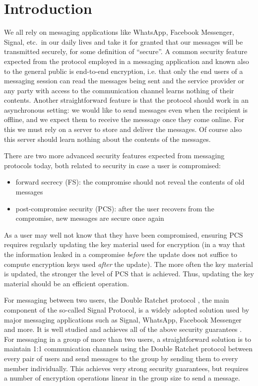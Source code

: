 \chapter{Introduction}

We all rely on messaging applications like WhatsApp, Facebook Messenger, Signal, etc.\ in our daily lives and take it for granted that our messages will be transmitted securely, for some definition of ``secure''. A common security feature expected from the protocol employed in a messaging application and known also to the general public is end-to-end encryption, i.e. that only the end users of a messaging session can read the messages being sent and the service provider or any party with access to the communication channel learns nothing of their contents. Another straightforward feature is that the protocol should work in an asynchronous setting: we would like to send messages even when the recipient is offline, and we expect them to receive the messsage once they come online. For this we must rely on a server to store and deliver the messages. Of course also this server should learn nothing about the contents of the messages.

There are two more advanced security features expected from messaging protocols today, both related to security in case a user is compromised:
\begin{itemize}
	\item forward secrecy (FS): the compromise should not reveal the contents of old messages
	\item post-compromise security (PCS): after the user recovers from the compromise, new messages are secure once again
\end{itemize}
As a user may well not know that they have been compromised, ensuring PCS requires regularly updating the key material used for encryption (in a way that the information leaked in a compromise \emph{before} the update does not suffice to compute encryption keys used \emph{after} the update). The more often the key material is updated, the stronger the level of PCS that is achieved. Thus, updating the key material should be an efficient operation.

For messaging between two users, the Double Ratchet protocol \cite{double-ratchet}, the main component of the so-called Signal Protocol, is a widely adopted solution used by major messaging applications such as Signal, WhatsApp, Facebook Messenger and more. It is well studied and achieves all of the above security guarantees \cite{double-ratchet-analysis}. For messaging in a group of more than two users, a straightforward solution is to maintain 1:1 communication channels using the Double Ratchet protocol between every pair of users and send messages to the group by sending them to every member individually. This achieves very strong security guarantees, but requires a number of encryption operations linear in the group size to send a message.

